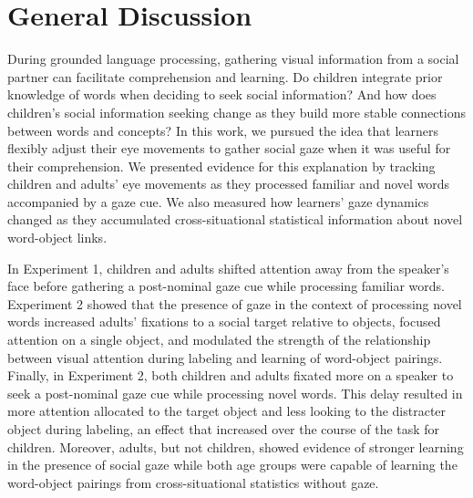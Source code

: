\documentclass[10pt, letterpaper]{article}
\begin{document}
\hypertarget{general-discussion}{%
\section{General Discussion}\label{general-discussion}}

During grounded language processing, gathering visual information from a
social partner can facilitate comprehension and learning. Do children
integrate prior knowledge of words when deciding to seek social
information? And how does children's social information seeking change
as they build more stable connections between words and concepts? In
this work, we pursued the idea that learners flexibly adjust their eye
movements to gather social gaze when it was useful for their
comprehension. We presented evidence for this explanation by tracking
children and adults' eye movements as they processed familiar and novel
words accompanied by a gaze cue. We also measured how learners' gaze
dynamics changed as they accumulated cross-situational statistical
information about novel word-object links.

In Experiment 1, children and adults shifted attention away from the
speaker's face before gathering a post-nominal gaze cue while processing
familiar words. Experiment 2 showed that the presence of gaze in the
context of processing novel words increased adults' fixations to a
social target relative to objects, focused attention on a single object,
and modulated the strength of the relationship between visual attention
during labeling and learning of word-object pairings. Finally, in
Experiment 2, both children and adults fixated more on a speaker to seek
a post-nominal gaze cue while processing novel words. This delay
resulted in more attention allocated to the target object and less
looking to the distracter object during labeling, an effect that
increased over the course of the task for children. Moreover, adults,
but not children, showed evidence of stronger learning in the presence
of social gaze while both age groups were capable of learning the
word-object pairings from cross-situational statistics without gaze.
\end{document}
